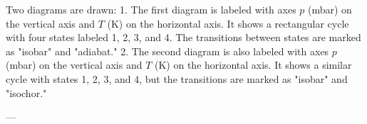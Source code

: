 Two diagrams are drawn:  
1. The first diagram is labeled with axes \( p \) (mbar) on the vertical axis and \( T \) (K) on the horizontal axis. It shows a rectangular cycle with four states labeled 1, 2, 3, and 4. The transitions between states are marked as "isobar" and "adiabat."  
2. The second diagram is also labeled with axes \( p \) (mbar) on the vertical axis and \( T \) (K) on the horizontal axis. It shows a similar cycle with states 1, 2, 3, and 4, but the transitions are marked as "isobar" and "isochor."  

---